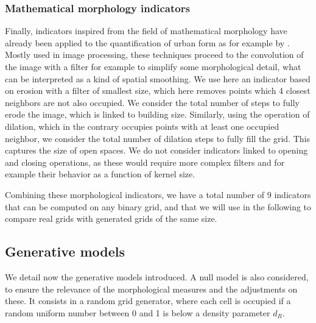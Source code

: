 \documentclass[letterpaper]{article}
\begin{document}
\subsubsection{Mathematical morphology indicators}

Finally, indicators inspired from the field of mathematical morphology \citep{serra1983image} have already been applied to the quantification of urban form as for example by \cite{pesaresi2003recognizing}. Mostly used in image processing, these techniques proceed to the convolution of the image with a filter for example to simplify some morphological detail, what can be interpreted as a kind of spatial smoothing. We use here an indicator based on erosion with a filter of smallest size, which here removes points which 4 closest neighbors are not also occupied. We consider the total number of steps to fully erode the image, which is linked to building size. Similarly, using the operation of dilation, which in the contrary occupies points with at least one occupied neighbor, we consider the total number of dilation steps to fully fill the grid. This captures the size of open spaces. We do not consider indicators linked to opening and closing operations, as these would require more complex filters and for example their behavior as a function of kernel size.


Combining these morphological indicators, we have a total number of 9 indicators that can be computed on any binary grid, and that we will use in the following to compare real grids with generated grids of the same size.








\subsection{Generative models}

We detail now the generative models introduced.  A null model is also considered, to ensure the relevance of the morphological measures and the adjustments on these. It consists in a random grid generator, where each cell is occupied if a random uniform number between 0 and 1 is below a density parameter $d_R$.
\end{document}
